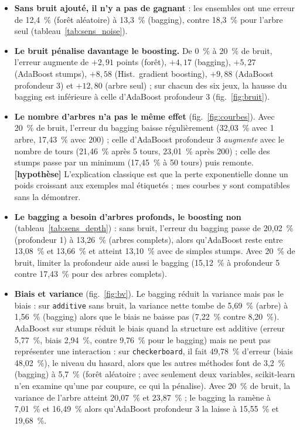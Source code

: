 \documentclass[11pt,a4paper]{article}
\newcommand{\hyp}{\textbf{[hypothèse]}}
\begin{document}
\begin{itemize}
\item \textbf{Sans bruit ajouté, il n'y a pas de gagnant} : les ensembles ont une erreur de 12,4~\% (forêt aléatoire) à 13,3~\% (bagging), contre 18,3~\% pour l'arbre seul (tableau~\ref{tab:sens_noise}).
\item \textbf{Le bruit pénalise davantage le boosting.} De 0~\% à 20~\% de bruit, l'erreur augmente de $+2{,}91$ points (forêt), $+4{,}17$ (bagging), $+5{,}27$ (AdaBoost stumps), $+8{,}58$ (Hist.\ gradient boosting), $+9{,}88$ (AdaBoost profondeur 3) et $+12{,}80$ (arbre seul) ; sur chacun des six jeux, la hausse du bagging est inférieure à celle d'AdaBoost profondeur 3 (fig.~\ref{fig:bruit}).
\item \textbf{Le nombre d'arbres n'a pas le même effet} (fig.~\ref{fig:courbes}). Avec 20~\% de bruit, l'erreur du bagging baisse régulièrement (32,03~\% avec 1 arbre, 17,43~\% avec 200) ; celle d'AdaBoost profondeur 3 \emph{augmente} avec le nombre de tours (21,46~\% après 5 tours, 23,01~\% après 200) ; celle des stumps passe par un minimum (17,45~\% à 50 tours) puis remonte. \hyp{} L'explication classique est que la perte exponentielle donne un poids croissant aux exemples mal étiquetés ; mes courbes y sont compatibles sans la démontrer.
\item \textbf{Le bagging a besoin d'arbres profonds, le boosting non} (tableau~\ref{tab:sens_depth}) : sans bruit, l'erreur du bagging passe de 20,02~\% (profondeur 1) à 13,26~\% (arbres complets), alors qu'AdaBoost reste entre 13,08~\% et 13,66~\% et atteint 13,10~\% avec de simples stumps. Avec 20~\% de bruit, limiter la profondeur aide aussi le bagging (15,12~\% à profondeur 5 contre 17,43~\% pour des arbres complets).
\item \textbf{Biais et variance} (fig.~\ref{fig:bv}). Le bagging réduit la variance mais pas le biais : sur \texttt{additive} sans bruit, la variance nette tombe de 5,69~\% (arbre) à 1,56~\% (bagging) alors que le biais ne baisse pas (7,22~\% contre 8,20~\%). AdaBoost sur stumps réduit le biais quand la structure est additive (erreur 5,77~\%, biais 2,94~\%, contre 9,76~\% pour le bagging) mais ne peut pas représenter une interaction : sur \texttt{checkerboard}, il fait 49,78~\% d'erreur (biais 48,02~\%), le niveau du hasard, alors que les autres méthodes font de 3,2~\% (bagging) à 5,7~\% (forêt aléatoire ; avec seulement deux variables, scikit-learn n'en examine qu'une par coupure, ce qui la pénalise). Avec 20~\% de bruit, la variance de l'arbre atteint 20,07~\% et 23,87~\% ; le bagging la ramène à 7,01~\% et 16,49~\% alors qu'AdaBoost profondeur 3 la laisse à 15,55~\% et 19,68~\%.
\end{itemize}
\end{document}
